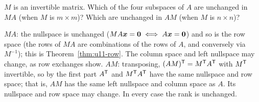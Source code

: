 \begin{exercise}\label{exr:u14-invertible}
$M$ is an invertible matrix. Which of the four subspaces of $A$ are unchanged in $MA$ (when $M$ is
$m\times m$)? Which are unchanged in $AM$ (when $M$ is $n\times n$)?
\end{exercise}
\begin{solution}
$MA$: the nullspace is unchanged ($MA\boldsymbol{x}=\boldsymbol{0}\iff A\boldsymbol{x}=\boldsymbol{0}$) and so is the row space
(the rows of $MA$ are combinations of the rows of $A$, and conversely via $M^{-1}$); this is
Theorem~\ref{thm:u11-row}. The column space and left nullspace may change, as row exchanges show.
$AM$: transposing, $(AM)^{\mathsf{T}}=M^{\mathsf{T}} A^{\mathsf{T}}$ with $M^{\mathsf{T}}$ invertible, so by the first part $A^{\mathsf{T}}$ and $M^{\mathsf{T}} A^{\mathsf{T}}$
have the same nullspace and row space; that is, $AM$ has the same left nullspace and column space as
$A$. Its nullspace and row space may change. In every case the rank is unchanged.
\end{solution}
